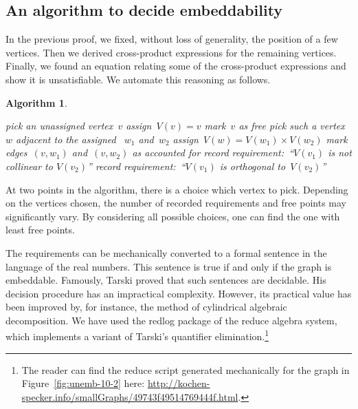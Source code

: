 \documentclass{report}
\newtheorem{algorithm}{Algorithm}[section]
\begin{document}
\subsection{An algorithm to decide embeddability}
In the previous proof, we fixed, without loss of generality, the position
of a few vertices.  Then we derived cross-product expressions for the
remaining vertices.  Finally, we found an equation relating some of
the cross-product expressions and show it is unsatisfiable.
We automate this reasoning as follows.

\begin{algorithm}
\begin{algorithmic}[5]
        \State pick an unassigned vertex~$v$
        \State assign~$V(v)=v$ 
        \State mark~$v$ as free
            \State pick such a vertex~$w$ adjacent to the
                    assigned ~$w_1$ and~$w_2$
            \State assign~$V(w)=V(w_1) \times V(w_2)$
            \State mark edges~$(v,w_1)$ and~$(v,w_2)$ as accounted for
        \EndWhile
    \EndWhile
    \pagebreak[2]
            \State record requirement:~``$V(v_1)$
                    is not collinear to $V(v_2)$''
        \EndIf
    \EndFor
        \State record requirement:~``$V(v_1)$ is orthogonal to~$V(v_2)$''
    \EndFor
\end{algorithmic}
\end{algorithm}

At two points in the algorithm, there is a choice which vertex to pick.
Depending on the vertices chosen, the number of recorded requirements
and free points may significantly vary. By considering all possible choices,
one can find the one with least free points.

The requirements can be mechanically converted
to a formal sentence
in the language of the real numbers.
This sentence is true if and only if the graph is embeddable.
Famously, Tarski proved\cite{tarski}
that such sentences are decidable.
His decision procedure has an impractical complexity.
However, its practical value has been improved
by, for instance, the method of cylindrical algebraic decomposition\cite{qecad}.
We have used the redlog\cite{redlog} package of the reduce algebra
system, which implements a variant of Tarski's quantifier
elimination.\footnote{%
    The reader can find the reduce script generated mechanically
    for the graph in Figure~\ref{fig:unemb-10-2} here:
    \url{http://kochen-specker.info/smallGraphs/49743f49514769444f.html}.  }
\end{document}
